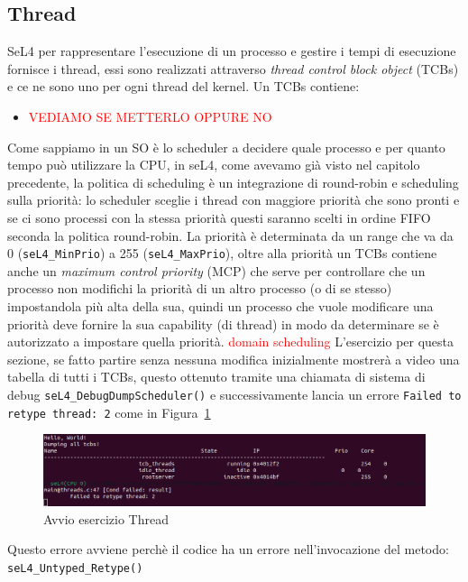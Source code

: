 \subsection{Thread}
SeL4 per rappresentare l'esecuzione di un processo e gestire i tempi di esecuzione fornisce i thread, essi sono realizzati attraverso \textit{thread control block object} (TCBs) e ce ne sono uno per ogni thread del kernel. Un TCBs contiene:
\begin{itemize}
	\item \textcolor{red}{VEDIAMO SE METTERLO OPPURE NO}
\end{itemize}
Come sappiamo in un SO è lo scheduler a decidere quale processo e per quanto tempo può utilizzare la CPU, in seL4, come avevamo già visto nel capitolo precedente, la politica di scheduling è un integrazione di round-robin e scheduling sulla priorità: lo scheduler sceglie i thread con maggiore priorità che sono pronti e se ci sono processi con la stessa priorità questi saranno scelti in ordine FIFO seconda la politica round-robin. La priorità è determinata da un range che va da 0 (\texttt{seL4\_MinPrio}) a 255 (\texttt{seL4\_MaxPrio}), oltre alla priorità un TCBs contiene anche un \textit{maximum control priority} (MCP) che serve per controllare che un processo non modifichi la priorità di un altro processo (o di se stesso) impostandola più alta della sua, quindi un processo che vuole modificare una priorità deve fornire la sua capability (di thread) in modo da determinare se è autorizzato a impostare quella priorità. \textcolor{red}{domain scheduling}
L'esercizio per questa sezione, se fatto partire senza nessuna modifica inizialmente mostrerà a video una tabella di tutti i TCBs, questo ottenuto tramite una chiamata di sistema di debug \texttt{seL4\_DebugDumpScheduler()} e successivamente lancia un errore \texttt{Failed to retype thread: 2} come in Figura~\ref{fig:TutorialThreads}
\begin{figure}[h]
  \includegraphics[width=\linewidth]{img/Threads.png}
  \caption{Avvio esercizio Thread}
  \label{fig:TutorialThreads}
\end{figure}
Questo errore avviene perchè il codice ha un errore nell'invocazione del metodo: \texttt{seL4\_Untyped\_Retype()}
